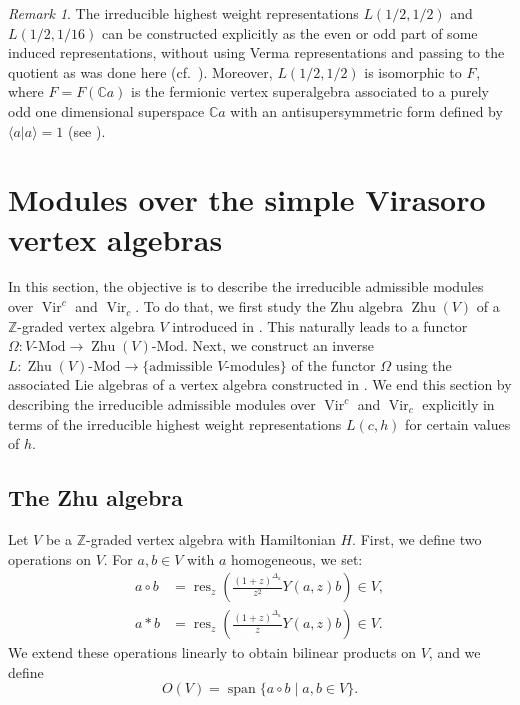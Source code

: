 \documentclass[a4paper, 12pt, reqno]{amsart}
\theoremstyle{remark}
\newtheorem{remark}[theorem]{Remark}
\DeclareMathOperator{\Vir}{Vir}
\DeclareMathOperator{\vspan}{span}
\DeclareMathOperator{\res}{res}
\DeclareMathOperator{\one}{\overline{1}}
\DeclareMathOperator{\Zhu}{Zhu}
\begin{document}
\begin{remark}
  \label{rmk:32}
  The irreducible highest weight representations $L(1/2, 1/2)$ and $L(1/2, 1/16)$ can be constructed explicitly as the even or odd part of some induced representations, without using Verma representations and passing to the quotient as was done here (cf.\ \cite[\S3]{kac_bombay_2013}).
  Moreover, $L(1/2, 1/2)$ is isomorphic to $F_{\one}$, where $F = F(\mathbb{C}a)$ is the fermionic vertex superalgebra associated to a purely odd one dimensional superspace $\mathbb{C}a$ with an antisupersymmetric form defined by $\langle a| a\rangle = 1$ (see ).
\end{remark}

\section{Modules over the simple Virasoro vertex algebras}
\label{sec:modules-over-simple}

In this section, the objective is to describe the irreducible admissible modules over $\Vir^c$ and $\Vir_c$.
To do that, we first study the Zhu algebra $\Zhu(V)$ of a $\mathbb{Z}$-graded vertex algebra $V$ introduced in \cite{zhu_modular_1996}.
This naturally leads to a functor $\Omega: \text{$V$-Mod} \to \text{$\Zhu(V)$-Mod}$.
Next, we construct an inverse $L: \text{$\Zhu(V)$-Mod} \to \{\text{admissible $V$-modules}\}$ of the functor $\Omega$ using the associated Lie algebras of a vertex algebra constructed in .
We end this section by describing the irreducible admissible modules over $\Vir^c$ and $\Vir_c$ explicitly in terms of the irreducible highest weight representations $L(c, h)$ for certain values of $h$.

\subsection{The Zhu algebra}
\label{sec:zhu-algebra}

Let $V$ be a $\mathbb{Z}$-graded vertex algebra with Hamiltonian $H$.
First, we define two operations on $V$.
For $a, b \in V$ with $a$ homogeneous, we set:
\begin{align*}
  a\circ b &= \res_z\left(\frac{(1 + z)^{\Delta_a}}{z^2}Y(a, z)b\right) \in V, \\
  a*b &= \res_z\left(\frac{(1 + z)^{\Delta_a}}{z}Y(a, z)b\right) \in V.
\end{align*}
We extend these operations linearly to obtain bilinear products on $V$, and we define
\begin{equation*}
  O(V) = \vspan\{a\circ b \mid a, b \in V\}.
\end{equation*}
\end{document}
